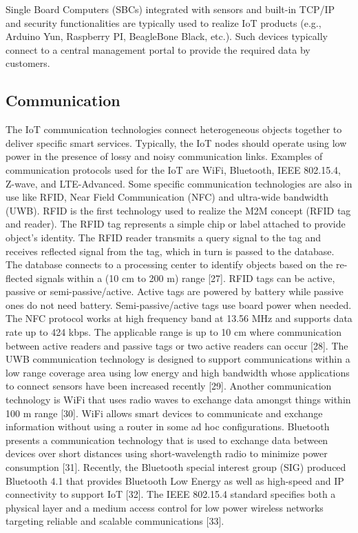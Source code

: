 Single Board Computers (SBCs) integrated with sensors and
built-in TCP/IP and security functionalities are typically used
to realize IoT products (e.g., Arduino Yun, Raspberry PI, BeagleBone
Black, etc.). Such devices typically connect to a central
management portal to provide the required data by customers.


\subsection{Communication}

The IoT communication technologies connect heterogeneous
objects together to deliver specific smart services. Typically, the
IoT nodes should operate using low power in the presence of
lossy and noisy communication links. Examples of communication
protocols used for the IoT are WiFi, Bluetooth, IEEE
802.15.4, Z-wave, and LTE-Advanced. Some specific communication
technologies are also in use like RFID, Near Field Communication
(NFC) and ultra-wide bandwidth (UWB). RFID is
the first technology used to realize the M2M concept (RFID
tag and reader). The RFID tag represents a simple chip or label
attached to provide object’s identity. The RFID reader transmits
a query signal to the tag and receives reflected signal from the
tag, which in turn is passed to the database. The database connects
to a processing center to identify objects based on the re-
flected signals within a (10 cm to 200 m) range [27]. RFID tags
can be active, passive or semi-passive/active. Active tags are
powered by battery while passive ones do not need battery.
Semi-passive/active tags use board power when needed.
The NFC protocol works at high frequency band at 13.56 MHz
and supports data rate up to 424 kbps. The applicable range is
up to 10 cm where communication between active readers and
passive tags or two active readers can occur [28]. The UWB communication
technology is designed to support communications
within a low range coverage area using low energy and high
bandwidth whose applications to connect sensors have been
increased recently [29].
Another communication technology is WiFi that uses radio
waves to exchange data amongst things within 100 m range
[30]. WiFi allows smart devices to communicate and exchange
information without using a router in some ad hoc configurations.
Bluetooth presents a communication technology that is
used to exchange data between devices over short distances using
short-wavelength radio to minimize power consumption [31].
Recently, the Bluetooth special interest group (SIG) produced
Bluetooth 4.1 that provides Bluetooth Low Energy as well as
high-speed and IP connectivity to support IoT [32]. The IEEE
802.15.4 standard specifies both a physical layer and a medium
access control for low power wireless networks targeting reliable
and scalable communications [33].

